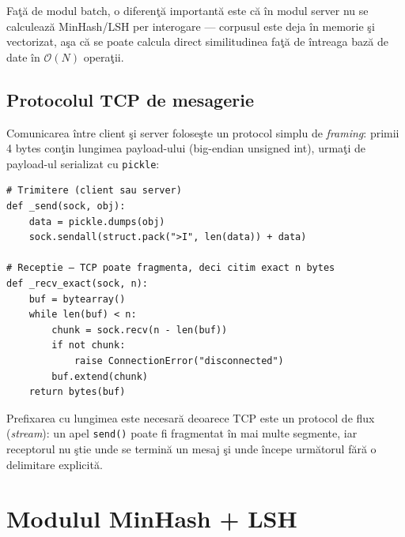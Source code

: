 \documentclass[a4paper,12pt]{report}
\begin{document}
Fa\c{t}\u{a} de modul batch, o diferen\c{t}\u{a} important\u{a} este c\u{a} \^{i}n modul server nu se calculeaz\u{a} MinHash/LSH per interogare — corpusul este deja \^{i}n memorie \c{s}i vectorizat, a\c{s}a c\u{a} se poate calcula direct similitudinea fa\c{t}\u{a} de \^{i}ntreaga baz\u{a} de date \^{i}n $\mathcal{O}(N)$ opera\c{t}ii.

\subsection*{Protocolul TCP de mesagerie}

Comunicarea \^{i}ntre client \c{s}i server folose\c{s}te un protocol simplu de \textit{framing}: primii 4 bytes con\c{t}in lungimea payload-ului (big-endian unsigned int), urma\c{t}i de payload-ul serializat cu \texttt{pickle}:

\begin{lstlisting}[caption={Protocol TCP client-server (framing cu lungime prefix\u{a})}]
# Trimitere (client sau server)
def _send(sock, obj):
    data = pickle.dumps(obj)
    sock.sendall(struct.pack(">I", len(data)) + data)

# Receptie — TCP poate fragmenta, deci citim exact n bytes
def _recv_exact(sock, n):
    buf = bytearray()
    while len(buf) < n:
        chunk = sock.recv(n - len(buf))
        if not chunk:
            raise ConnectionError("disconnected")
        buf.extend(chunk)
    return bytes(buf)
\end{lstlisting}

Prefixarea cu lungimea este necesar\u{a} deoarece TCP este un protocol de flux (\textit{stream}): un apel \texttt{send()} poate fi fragmentat \^{i}n mai multe segmente, iar receptorul nu \c{s}tie unde se termin\u{a} un mesaj \c{s}i unde \^{i}ncepe urm\u{a}torul f\u{a}r\u{a} o delimitare explicit\u{a}.

\section{Modulul MinHash + LSH}
\end{document}
